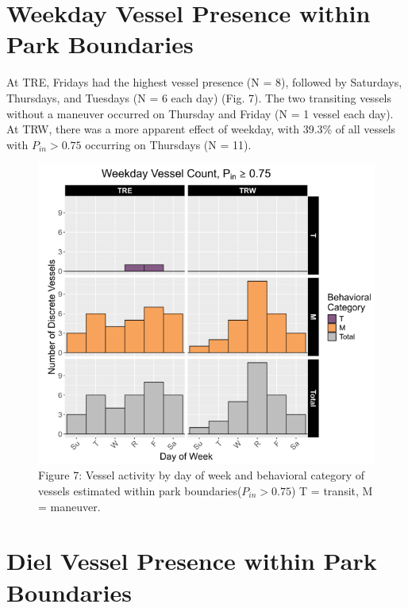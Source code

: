 \documentclass[
  letterpaper,
  oneside,
  open=any]{scrbook}
\begin{document}
\section{Weekday Vessel Presence within Park
Boundaries}\label{weekday-vessel-presence-within-park-boundaries}

At TRE, Fridays had the highest vessel presence (N = 8), followed by
Saturdays, Thursdays, and Tuesdays (N = 6 each day) (Fig. 7). The two
transiting vessels without a maneuver occurred on Thursday and Friday (N
= 1 vessel each day). At TRW, there was a more apparent effect of
weekday, with 39.3\% of all vessels with \(P_{in} > 0.75\) occurring on
Thursdays (N = 11).

\begin{figure}[H]

{\centering \includegraphics{images/Figure.7.PNG}

}

\caption{Figure 7: Vessel activity by day of week and behavioral
category of vessels estimated within park boundaries(\(P_{in} > 0.75\))
T = transit, M = maneuver.}

\end{figure}%

\section{Diel Vessel Presence within Park
Boundaries}\label{diel-vessel-presence-within-park-boundaries}
\end{document}
